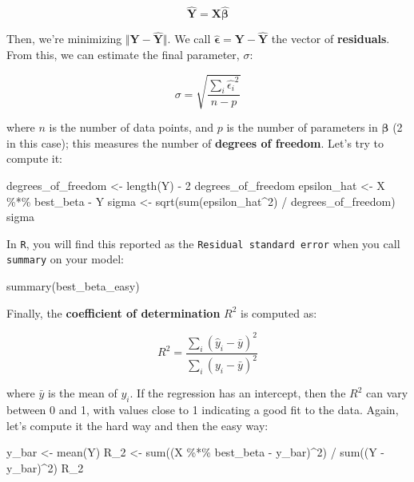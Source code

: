 \documentclass[
  letterpaper,
  DIV=11,
  numbers=noendperiod]{scrreprt}
\newenvironment{Shaded}{\begin{snugshade}}{\end{snugshade}}
\newcommand{\NormalTok}[1]{\textcolor[rgb]{0.00,0.23,0.31}{#1}}
\begin{document}
\[
\hat{\mathbf{Y}} = \mathbf{X}\hat{\mathbf{\beta}}
\]

Then, we're minimizing \(\Vert \mathbf{Y} - \hat{\mathbf{Y}}\Vert\). We
call \(\hat{\mathbf{\epsilon}} = \mathbf{Y} - \hat{\mathbf{Y}}\) the
vector of \textbf{residuals}. From this, we can estimate the final
parameter, \(\sigma\):

\[
\sigma = \sqrt{\frac{\sum_i \hat{\epsilon_i}^2}{n -  p}}
\]

where \(n\) is the number of data points, and \(p\) is the number of
parameters in \(\mathbf{\beta}\) (2 in this case); this measures the
number of \textbf{degrees of freedom}. Let's try to compute it:

\begin{Shaded}
\begin{Highlighting}[]
\NormalTok{degrees\_of\_freedom \textless{}{-} length(Y) {-} 2}
\NormalTok{degrees\_of\_freedom}
\NormalTok{epsilon\_hat \textless{}{-} X \%*\% best\_beta {-} Y}
\NormalTok{sigma \textless{}{-} sqrt(sum(epsilon\_hat\^{}2) / degrees\_of\_freedom)}
\NormalTok{sigma}
\end{Highlighting}
\end{Shaded}

In \texttt{R}, you will find this reported as the
\texttt{Residual\ standard\ error} when you call \texttt{summary} on
your model:

\begin{Shaded}
\begin{Highlighting}[]
\NormalTok{summary(best\_beta\_easy)}
\end{Highlighting}
\end{Shaded}

Finally, the \textbf{coefficient of determination} \(R^2\) is computed
as:

\[
R^2 = \frac{\sum_i (\hat{y}_i - \bar{y})^2}{\sum_i ({y}_i - \bar{y})^2}
\]

where \(\bar{y}\) is the mean of \(y_i\). If the regression has an
intercept, then the \(R^2\) can vary between 0 and 1, with values close
to 1 indicating a good fit to the data. Again, let's compute it the hard
way and then the easy way:

\begin{Shaded}
\begin{Highlighting}[]
\NormalTok{y\_bar \textless{}{-} mean(Y)}
\NormalTok{R\_2 \textless{}{-} sum((X \%*\% best\_beta {-} y\_bar)\^{}2) / sum((Y {-} y\_bar)\^{}2)}
\NormalTok{R\_2}
\end{Highlighting}
\end{Shaded}
\end{document}
